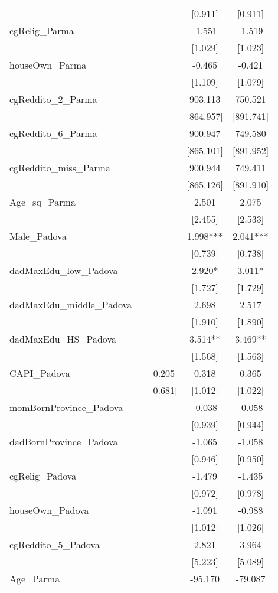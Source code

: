 \documentclass[]{article}
\begin{document}
\begin{tabular}{lcccc}
 &  &  & [0.911] & [0.911] \\
cgRelig\_Parma &  &  & -1.551 & -1.519 \\
 &  &  & [1.029] & [1.023] \\
houseOwn\_Parma &  &  & -0.465 & -0.421 \\
 &  &  & [1.109] & [1.079] \\
cgReddito\_2\_Parma &  &  & 903.113 & 750.521 \\
 &  &  & [864.957] & [891.741] \\
cgReddito\_6\_Parma &  &  & 900.947 & 749.580 \\
 &  &  & [865.101] & [891.952] \\
cgReddito\_miss\_Parma &  &  & 900.944 & 749.411 \\
 &  &  & [865.126] & [891.910] \\
Age\_sq\_Parma &  &  & 2.501 & 2.075 \\
 &  &  & [2.455] & [2.533] \\
Male\_Padova &  &  & 1.998*** & 2.041*** \\
 &  &  & [0.739] & [0.738] \\
dadMaxEdu\_low\_Padova &  &  & 2.920* & 3.011* \\
 &  &  & [1.727] & [1.729] \\
dadMaxEdu\_middle\_Padova &  &  & 2.698 & 2.517 \\
 &  &  & [1.910] & [1.890] \\
dadMaxEdu\_HS\_Padova &  &  & 3.514** & 3.469** \\
 &  &  & [1.568] & [1.563] \\
CAPI\_Padova &  & 0.205 & 0.318 & 0.365 \\
 &  & [0.681] & [1.012] & [1.022] \\
momBornProvince\_Padova &  &  & -0.038 & -0.058 \\
 &  &  & [0.939] & [0.944] \\
dadBornProvince\_Padova &  &  & -1.065 & -1.058 \\
 &  &  & [0.946] & [0.950] \\
cgRelig\_Padova &  &  & -1.479 & -1.435 \\
 &  &  & [0.972] & [0.978] \\
houseOwn\_Padova &  &  & -1.091 & -0.988 \\
 &  &  & [1.012] & [1.026] \\
cgReddito\_5\_Padova &  &  & 2.821 & 3.964 \\
 &  &  & [5.223] & [5.089] \\
Age\_Parma &  &  & -95.170 & -79.087 \\

\end{tabular}
\end{document}
